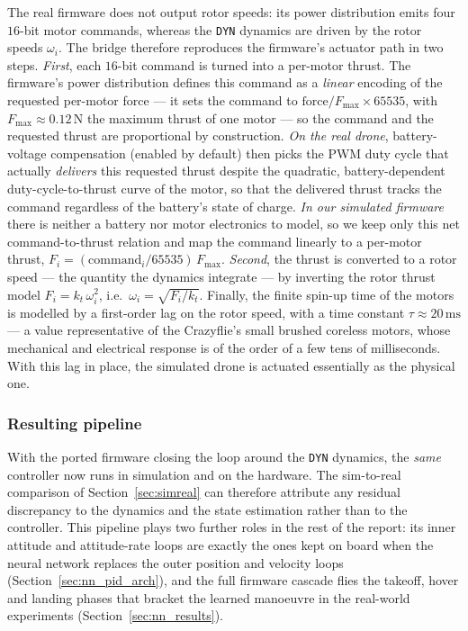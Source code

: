 \documentclass[11pt,a4paper]{article}
\theoremstyle{remark}
\numberwithin{equation}{section}
\begin{document}
The real firmware does not output rotor speeds: its power distribution emits four
$16$-bit motor commands, whereas the \texttt{DYN} dynamics are driven by the rotor
speeds $\omega_i$. The bridge therefore reproduces the firmware's actuator path in
two steps. \emph{First}, each $16$-bit command is turned into a per-motor thrust.
The firmware's power distribution defines this command as a \emph{linear} encoding
of the requested per-motor force --- it sets the command to
$\mathrm{force}/F_{\max} \times 65535$, with $F_{\max} \approx 0.12\,\mathrm{N}$
the maximum thrust of one motor --- so the command and the requested thrust are
proportional by construction. \emph{On the real drone}, battery-voltage
compensation (enabled by default) then picks the PWM duty cycle that actually
\emph{delivers} this requested thrust despite the quadratic, battery-dependent
duty-cycle-to-thrust curve of the motor, so that the delivered thrust tracks the
command regardless of the battery's state of charge. \emph{In our simulated
firmware} there is neither a battery nor motor electronics to model, so we keep
only this net command-to-thrust relation and map the command linearly to a
per-motor thrust, $F_i = (\mathrm{command}_i/65535)\,F_{\max}$. \emph{Second}, the
thrust is converted to a rotor speed --- the quantity the
dynamics integrate --- by inverting the rotor thrust model $F_i = k_t\,\omega_i^2$,
i.e.\ $\omega_i = \sqrt{F_i/k_t}$. Finally, the finite spin-up time of the motors
is modelled by a first-order lag on the rotor speed, with a time constant
$\tau \approx 20\,\mathrm{ms}$ --- a value representative of the Crazyflie's small
brushed coreless motors, whose mechanical and electrical response is of the order
of a few tens of milliseconds. With this lag in place, the simulated drone is
actuated essentially as the physical one.

\subsubsection*{Resulting pipeline}

With the ported firmware closing the loop around the \texttt{DYN} dynamics, the
\emph{same} controller now runs in simulation and on the hardware. The sim-to-real
comparison of Section~\ref{sec:simreal} can therefore attribute any residual
discrepancy to the dynamics and the state estimation rather than to the
controller. This pipeline plays two further roles in the rest of the report: its
inner attitude and attitude-rate loops are exactly the ones kept on board when the
neural network replaces the outer position and velocity loops
(Section~\ref{sec:nn_pid_arch}), and the full firmware cascade flies the
takeoff, hover and landing phases that bracket the learned manoeuvre in the
real-world experiments (Section~\ref{sec:nn_results}).
\end{document}
